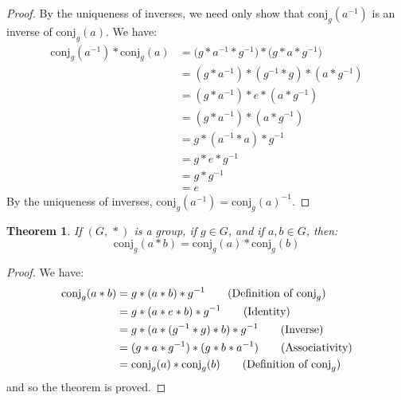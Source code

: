 \documentclass{article}
\theoremstyle{plain}
\newtheorem{theorem}{Theorem}[section]
\theoremstyle{normal}
\begin{document}
        \begin{proof}
            By the uniqueness of inverses, we need only show that
            $\textrm{conj}_{g}(a^{-1})$ is an inverse of
            $\textrm{conj}_{g}(a)$. We have:
            \begin{align}
                \textrm{conj}_{g}(a^{-1})*\textrm{conj}_{g}(a)
                &=\big(g*a^{-1}*g^{-1}\big)*\big(g*a*g^{-1}\big)
                    \tag{Substitution}\\
                &=(g*a^{-1})*(g^{-1}*g)*(a*g^{-1})\tag{Associativity}\\
                &=(g*a^{-1})*e*(a*g^{-1})\tag{Inverse}\\
                &=(g*a^{-1})*(a*g^{-1})\tag{Identity}\\
                &=g*(a^{-1}*a)*g^{-1}\tag{Associativity}\\
                &=g*e*g^{-1}\tag{Inverse}\\
                &=g*g^{-1}\tag{Identity}\\
                &=e\tag{Inverse}
            \end{align}
            By the uniqueness of inverses,
            $\textrm{conj}_{g}(a^{-1})=\textrm{conj}_{g}(a)^{-1}$.
        \end{proof}
        \begin{theorem}
            If $(G,\,*)$ is a group, if $g\in{G}$, and if $a,b\in{G}$, then:
            \begin{equation}
                \textrm{conj}_{g}(a*b)
                =\textrm{conj}_{g}(a)*\textrm{conj}_{g}(b)
            \end{equation}
        \end{theorem}
        \begin{proof}
            We have:
            \begin{align}
                \textrm{conj}_{g}(a*b)
                &=g*(a*b)*g^{-1}\tag{Definition of $\textrm{conj}_{g}$}\\
                &=g*(a*e*b)*g^{-1}\tag{Identity}\\
                &=g*(a*(g^{-1}*g)*b)*g^{-1}\tag{Inverse}\\
                &=(g*a*g^{-1})*(g*b*a^{-1})\tag{Associativity}\\
                &=\textrm{conj}_{g}(a)*\textrm{conj}_{g}(b)
                    \tag{Definition of $\textrm{conj}_{g}$}
            \end{align}
            and so the theorem is proved.
        \end{proof}
\end{document}
